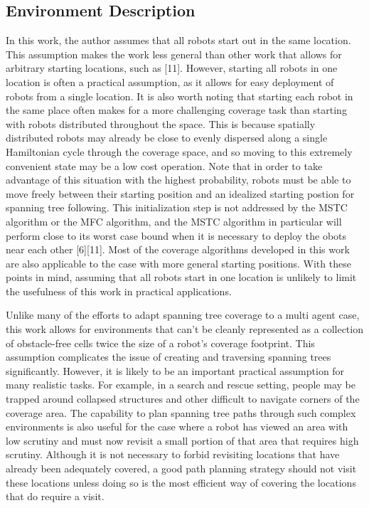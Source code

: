 
\subsection{Environment Description}

In this work, the author assumes that all robots start out in the same location. This assumption makes the work less general than other work that allows for arbitrary starting locations, such as [11]. However, starting all robots in one location is often a practical assumption, as it allows for easy deployment of robots from a single location. It is also worth noting that starting each robot in the same place often makes for a more challenging coverage task than starting with robots distributed throughout the space. This is because spatially distributed robots may already be close to evenly dispersed along a single Hamiltonian cycle through the coverage space, and so moving to this extremely convenient state may be a low cost operation. Note that in order to take advantage of this situation with the highest probability, robots must be able to move freely between their starting position and an idealized starting postion for spanning tree following. This initialization step is not addressed by the MSTC algorithm or the MFC algorithm, and the MSTC algorithm in particular will perform close to its worst case bound when it is necessary to deploy the obots near each other [6][11]. Most of the coverage algorithms developed in this work are also applicable to the case with more general starting positions. With these points in mind, assuming that all robots start in one location is unlikely to limit the usefulness of this work in practical applications.

Unlike many of the efforts to adapt spanning tree coverage to a multi agent case, this work allows for environments that can't be cleanly represented as a collection of obstacle-free cells twice the size of a robot's coverage footprint. This assumption complicates the issue of creating and traversing spanning trees significantly. However, it is likely to be an important practical assumption for many realistic tasks. For example, in a search and rescue setting, people may be trapped around collapsed structures and other difficult to navigate corners of the coverage area. The capability to plan spanning tree paths through such complex environments is also useful for the case where a robot has viewed an area with low scrutiny and must now revisit a small portion of that area that requires high scrutiny. Although it is not necessary to forbid revisiting locations that have already been adequately covered, a good path planning strategy should not visit these locations unless doing so is the most efficient way of covering the locations that do require a visit.

